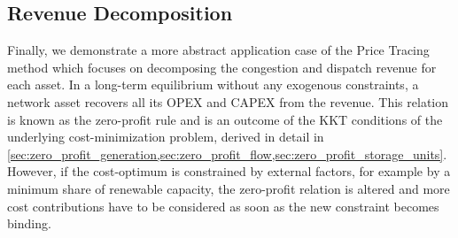 \documentclass[11pt,twocolumn]{article}
\begin{document}





\subsection{Revenue Decomposition}

Finally, we demonstrate a more abstract application case of the Price Tracing method which focuses on decomposing the congestion and dispatch revenue for each asset. In a long-term equilibrium without any exogenous constraints, a network asset recovers all its \ac{OPEX} and \ac{CAPEX} from the revenue. This relation is known as the zero-profit rule and is an outcome of the \ac{KKT} conditions of the underlying cost-minimization problem, derived in detail in \cref{sec:zero_profit_generation,sec:zero_profit_flow,sec:zero_profit_storage_units}. However, if the cost-optimum is constrained by external factors, for example by a minimum share of renewable capacity, the zero-profit relation is altered and more cost contributions have to be considered \cite{brown_decreasing_2020} as soon as the new constraint becomes binding. 
\end{document}
